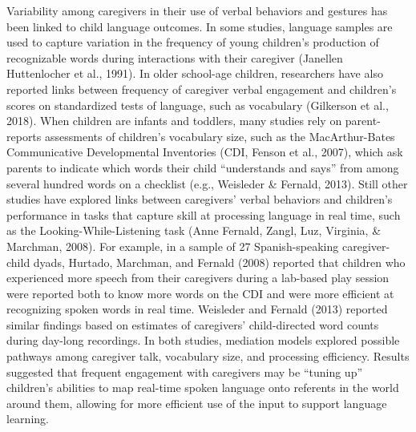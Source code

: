 \documentclass[
  man,floatsintext]{apa6}
\begin{document}
Variability among caregivers in their use of verbal behaviors and gestures has been linked to child language outcomes. In some studies, language samples are used to capture variation in the frequency of young children's production of recognizable words during interactions with their caregiver (Janellen Huttenlocher et al., 1991). In older school-age children, researchers have also reported links between frequency of caregiver verbal engagement and children's scores on standardized tests of language, such as vocabulary (Gilkerson et al., 2018). When children are infants and toddlers, many studies rely on parent-reports assessments of children's vocabulary size, such as the MacArthur-Bates Communicative Developmental Inventories (CDI, Fenson et al., 2007), which ask parents to indicate which words their child ``understands and says'' from among several hundred words on a checklist (e.g., Weisleder \& Fernald, 2013). Still other studies have explored links between caregivers' verbal behaviors and children's performance in tasks that capture skill at processing language in real time, such as the Looking-While-Listening task (Anne Fernald, Zangl, Luz, Virginia, \& Marchman, 2008). For example, in a sample of 27 Spanish-speaking caregiver-child dyads, Hurtado, Marchman, and Fernald (2008) reported that children who experienced more speech from their caregivers during a lab-based play session were reported both to know more words on the CDI and were more efficient at recognizing spoken words in real time. Weisleder and Fernald (2013) reported similar findings based on estimates of caregivers' child-directed word counts during day-long recordings. In both studies, mediation models explored possible pathways among caregiver talk, vocabulary size, and processing efficiency. Results suggested that frequent engagement with caregivers may be ``tuning up'' children's abilities to map real-time spoken language onto referents in the world around them, allowing for more efficient use of the input to support language learning.
\end{document}
